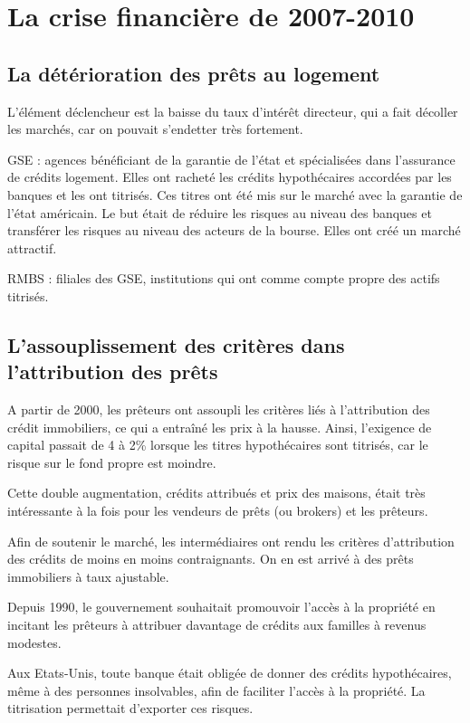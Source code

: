 \section{La crise financière de 2007-2010}

	\subsection{La détérioration des prêts au logement}
	
	L'élément déclencheur est la baisse du taux d'intérêt directeur, qui a fait décoller les marchés, car on pouvait s'endetter très fortement.
	
	GSE : agences bénéficiant de la garantie de l'état et spécialisées dans l'assurance de crédits logement. Elles ont racheté les crédits hypothécaires accordées par les banques et les ont titrisés. Ces titres ont été mis sur le marché avec la garantie de l'état américain. Le but était de réduire les risques au niveau des banques et transférer les risques au niveau des acteurs de la bourse. Elles ont créé un marché attractif.
	
	RMBS : filiales des GSE, institutions qui ont comme compte propre des actifs titrisés.
	
	\subsection{L'assouplissement des critères dans l'attribution des prêts}
	
	A partir de 2000, les prêteurs ont assoupli les critères liés à l'attribution des crédit immobiliers, ce qui a entraîné les prix à la hausse. Ainsi, l'exigence de capital passait de 4 à 2\% lorsque les titres hypothécaires sont titrisés, car le risque sur le fond propre est moindre.

	Cette double augmentation, crédits attribués et prix des maisons, était très intéressante à la fois pour les vendeurs de prêts (ou brokers) et les prêteurs. 

	Afin de soutenir le marché, les intermédiaires ont rendu les critères 
d'attribution des crédits de moins en moins contraignants. On en est arrivé à des prêts immobiliers à taux ajustable.

	Depuis 1990, le gouvernement souhaitait promouvoir l'accès à la propriété en incitant les prêteurs à attribuer davantage de crédits aux familles à revenus modestes.

	Aux Etats-Unis, toute banque était obligée de donner des crédits hypothécaires, même à des personnes insolvables, afin de faciliter l'accès à la propriété. La titrisation permettait d'exporter ces risques.
	
